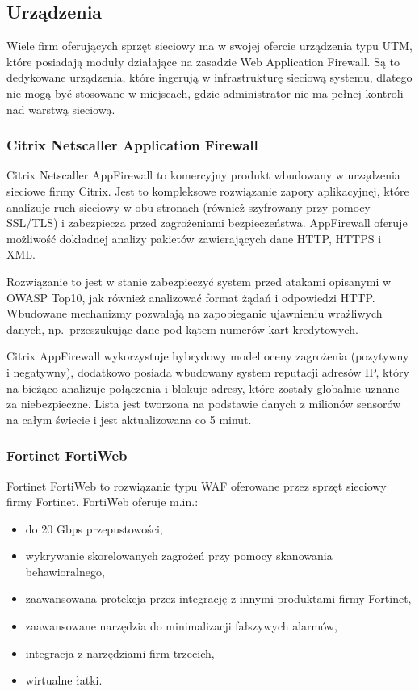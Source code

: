 \documentclass[11pt,a4paper,polish,thesis,oneside]{dcsbook}
\begin{document}
\subsection{Urządzenia}
Wiele firm oferujących sprzęt sieciowy ma w swojej ofercie urządzenia typu UTM, które posiadają moduły działające na zasadzie Web Application Firewall. Są to dedykowane urządzenia, które ingerują w infrastrukturę sieciową systemu, dlatego nie mogą być stosowane w miejscach, gdzie administrator nie ma pełnej kontroli nad warstwą sieciową.

\subsubsection{Citrix Netscaller Application Firewall}
Citrix Netscaller AppFirewall \cite{citrix} to komercyjny produkt wbudowany w urządzenia sieciowe firmy Citrix. Jest to kompleksowe rozwiązanie zapory aplikacyjnej, które analizuje ruch sieciowy w obu stronach (również szyfrowany przy pomocy SSL/TLS) i zabezpiecza przed zagrożeniami bezpieczeństwa. AppFirewall oferuje możliwość dokładnej analizy pakietów zawierających dane HTTP, HTTPS i XML.

Rozwiązanie to jest w stanie zabezpieczyć system przed atakami opisanymi w OWASP Top10, jak również analizować format żądań i odpowiedzi HTTP. Wbudowane mechanizmy pozwalają na zapobieganie ujawnieniu wrażliwych danych, np.~przeszukując dane pod kątem numerów kart kredytowych.

Citrix AppFirewall wykorzystuje hybrydowy model oceny zagrożenia (pozytywny i negatywny), dodatkowo posiada wbudowany system reputacji adresów IP, który na bieżąco analizuje połączenia i blokuje adresy, które zostały globalnie uznane za niebezpieczne. Lista jest tworzona na podstawie danych z milionów sensorów na całym świecie i jest aktualizowana co 5 minut.

\subsubsection{Fortinet FortiWeb}
Fortinet FortiWeb \cite{fortiweb} to rozwiązanie typu WAF oferowane przez sprzęt sieciowy firmy Fortinet. FortiWeb oferuje m.in.:
\begin{itemize}
\item do 20 Gbps przepustowości,
\item wykrywanie skorelowanych zagrożeń przy pomocy skanowania behawioralnego,
\item zaawansowana protekcja przez integrację z innymi produktami firmy Fortinet,
\item zaawansowane narzędzia do minimalizacji fałszywych alarmów,
\item integracja z narzędziami firm trzecich,
\item wirtualne łatki.
\end{itemize}
\end{document}

